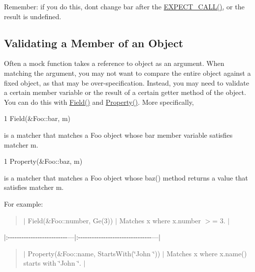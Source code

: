 Remember\+: if you do this, don\textquotesingle{}t change {\ttfamily bar} after the {\ttfamily \hyperlink{gmock-spec-builders_8h_a535a6156de72c1a2e25a127e38ee5232}{E\+X\+P\+E\+C\+T\+\_\+\+C\+A\+L\+L()}}, or the result is undefined.

\subsection*{Validating a Member of an Object}

Often a mock function takes a reference to object as an argument. When matching the argument, you may not want to compare the entire object against a fixed object, as that may be over-\/specification. Instead, you may need to validate a certain member variable or the result of a certain getter method of the object. You can do this with {\ttfamily \hyperlink{namespacetesting_a4df3849391696aa93ac3a7703a717c2a}{Field()}} and {\ttfamily \hyperlink{namespacetesting_a0fad10571e23f7bc0d5c83d4c31ba740}{Property()}}. More specifically,


\begin{DoxyCode}
1 Field(&Foo::bar, m)
\end{DoxyCode}


is a matcher that matches a {\ttfamily Foo} object whose {\ttfamily bar} member variable satisfies matcher {\ttfamily m}.


\begin{DoxyCode}
1 Property(&Foo::baz, m)
\end{DoxyCode}


is a matcher that matches a {\ttfamily Foo} object whose {\ttfamily baz()} method returns a value that satisfies matcher {\ttfamily m}.

For example\+:

\begin{quote}
$\vert$ {\ttfamily Field(\&\+Foo\+::number, Ge(3))} $\vert$ Matches {\ttfamily x} where {\ttfamily x.\+number $>$= 3}. $\vert$ \end{quote}
$\vert$\+:-\/-\/-\/-\/-\/-\/-\/-\/-\/-\/-\/-\/-\/-\/-\/-\/-\/-\/-\/-\/-\/-\/-\/-\/-\/-\/---$\vert$\+:-\/-\/-\/-\/-\/-\/-\/-\/-\/-\/-\/-\/-\/-\/-\/-\/-\/-\/-\/-\/-\/-\/-\/-\/-\/-\/-\/-\/-\/-\/-\/-\/---$\vert$ \begin{quote}
$\vert$ {\ttfamily Property(\&Foo\+::name, Starts\+With(\char`\"{}\+John \char`\"{}))} $\vert$ Matches {\ttfamily x} where {\ttfamily x.\+name()} starts with {\ttfamily \char`\"{}\+John \char`\"{}}. $\vert$ \end{quote}


